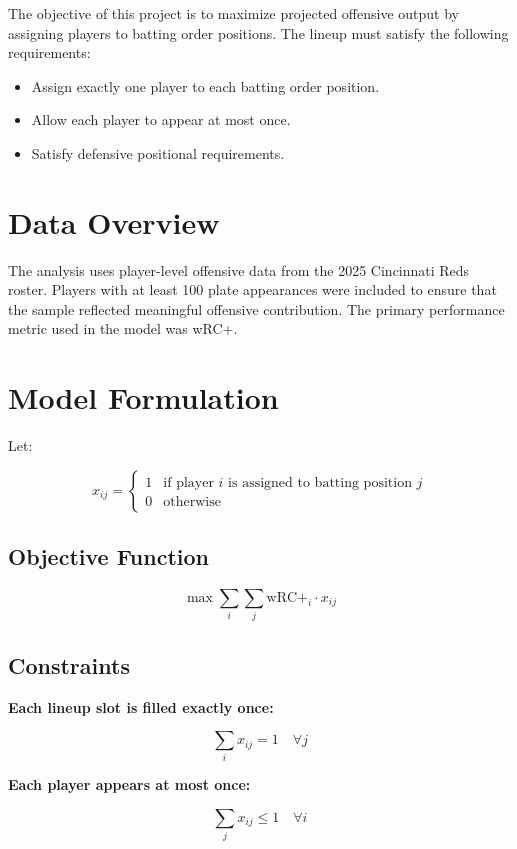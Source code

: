 \documentclass[12pt]{article}
\begin{document}
The objective of this project is to maximize projected offensive output by assigning players to batting order positions. The lineup must satisfy the following requirements:

\begin{itemize}
    \item Assign exactly one player to each batting order position.
    \item Allow each player to appear at most once.
    \item Satisfy defensive positional requirements.
\end{itemize}

\section{Data Overview}

The analysis uses player-level offensive data from the 2025 Cincinnati Reds roster. Players with at least 100 plate appearances were included to ensure that the sample reflected meaningful offensive contribution. The primary performance metric used in the model was wRC+.

\section{Model Formulation}

Let:

\[
x_{ij} =
\begin{cases}
1 & \text{if player } i \text{ is assigned to batting position } j \\
0 & \text{otherwise}
\end{cases}
\]

\subsection*{Objective Function}

\[
\max \sum_i \sum_j \text{wRC+}_i \cdot x_{ij}
\]

\subsection*{Constraints}

\textbf{Each lineup slot is filled exactly once:}

\[
\sum_i x_{ij} = 1 \quad \forall j
\]

\textbf{Each player appears at most once:}

\[
\sum_j x_{ij} \leq 1 \quad \forall i
\]
\end{document}
